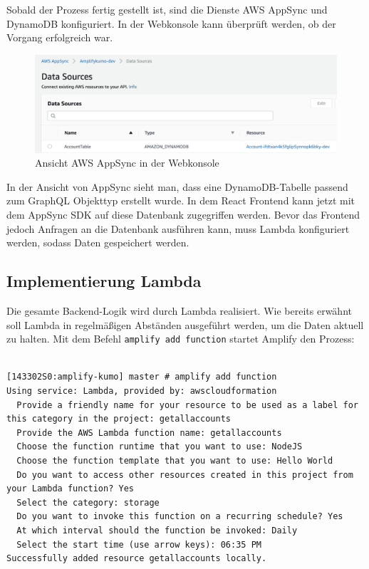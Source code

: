 Sobald der Prozess fertig gestellt ist, sind die Dienste AWS AppSync und DynamoDB konfiguriert.
In der Webkonsole kann überprüft werden, ob der Vorgang erfolgreich war.

\begin{figure}[htbp]
    \centering
    \includegraphics[width=1.0\textwidth]{50-Implementierung/AppSync-DynamoDB.png}
    \caption{Ansicht AWS AppSync in der Webkonsole}
    \label{fig:meine-grafik}
\end{figure}

In der Ansicht von AppSync sieht man, dass eine DynamoDB-Tabelle passend zum GraphQL Objekttyp erstellt wurde.
In dem React Frontend kann jetzt mit dem AppSync SDK auf diese Datenbank zugegriffen werden.
Bevor das Frontend jedoch Anfragen an die Datenbank ausführen kann, muss Lambda konfiguriert werden, sodass Daten gespeichert werden.

\subsection{Implementierung Lambda}
Die gesamte Backend-Logik wird durch Lambda realisiert.
Wie bereits erwähnt soll Lambda in regelmäßigen Abständen ausgeführt werden, um die Daten aktuell zu halten.
Mit dem Befehl \verb+amplify add function+ startet Amplify den Prozess:

\begin{lstlisting}[basicstyle=\ttfamily\small, breaklines=true , frame = single, backgroundcolor=\color{lavender} ]

[143302S0:amplify-kumo] master # amplify add function
Using service: Lambda, provided by: awscloudformation
  Provide a friendly name for your resource to be used as a label for this category in the project: getallaccounts
  Provide the AWS Lambda function name: getallaccounts
  Choose the function runtime that you want to use: NodeJS
  Choose the function template that you want to use: Hello World
  Do you want to access other resources created in this project from your Lambda function? Yes
  Select the category: storage
  Do you want to invoke this function on a recurring schedule? Yes
  At which interval should the function be invoked: Daily
  Select the start time (use arrow keys): 06:35 PM
Successfully added resource getallaccounts locally.
\end{lstlisting}

